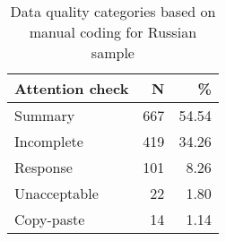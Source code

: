 \begin{table}

\caption{Data quality categories based on manual coding for Russian sample}
\centering
\begin{tabular}[t]{lrr}
\toprule
Attention check & N & \%\\
\midrule
Summary & 667 & 54.54\\
Incomplete & 419 & 34.26\\
Response & 101 & 8.26\\
Unacceptable & 22 & 1.80\\
Copy-paste & 14 & 1.14\\
\bottomrule
\end{tabular}
\end{table}
